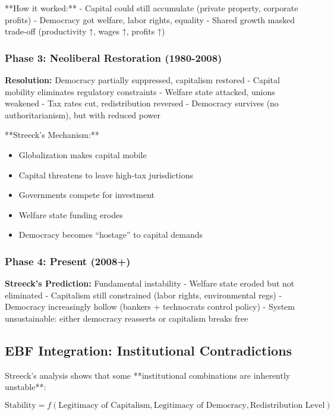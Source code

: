 **How it worked:**
- Capital could still accumulate (private property, corporate profits)
- Democracy got welfare, labor rights, equality
- Shared growth masked trade-off (productivity ↑, wages ↑, profits ↑)

\subsubsection{Phase 3: Neoliberal Restoration (1980-2008)}

\textbf{Resolution:} Democracy partially suppressed, capitalism restored
- Capital mobility eliminates regulatory constraints
- Welfare state attacked, unions weakened
- Tax rates cut, redistribution reversed
- Democracy survives (no authoritarianism), but with reduced power

**Streeck's Mechanism:**
\begin{itemize}
\item Globalization makes capital mobile
\item Capital threatens to leave high-tax jurisdictions
\item Governments compete for investment
\item Welfare state funding erodes
\item Democracy becomes ``hostage'' to capital demands
\end{itemize}

\subsubsection{Phase 4: Present (2008+)}

\textbf{Streeck's Prediction:} Fundamental instability
- Welfare state eroded but not eliminated
- Capitalism still constrained (labor rights, environmental regs)
- Democracy increasingly hollow (bankers + technocrats control policy)
- System unsustainable: either democracy reasserts or capitalism breaks free

\subsection{EBF Integration: Institutional Contradictions}

Streeck's analysis shows that some **institutional combinations are inherently unstable**:

\begin{equation}
\text{Stability} = f(\text{Legitimacy of Capitalism}, \text{Legitimacy of Democracy}, \text{Redistribution Level})
\end{equation}

